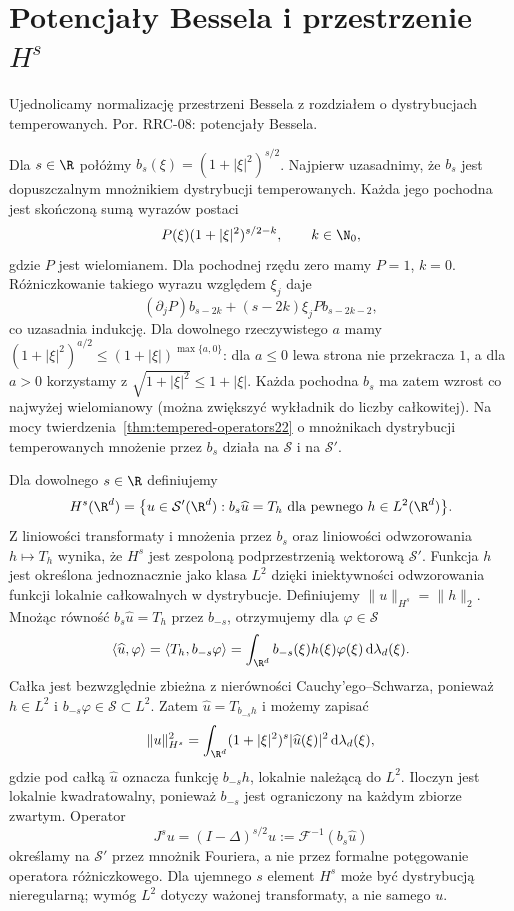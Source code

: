 \setcounter{section}{15}
\section{Potencjały Bessela i przestrzenie \texorpdfstring{$H^s$}{Hs}}
\label{sec:dt-bessel}
\providecommand{\atlasref}[2]{#2}

Ujednolicamy normalizację przestrzeni Bessela z rozdziałem
o dystrybucjach temperowanych. Por.
\atlasref{PDE-08::thm:pde8-Hs}{RRC-08: potencjały Bessela}.


Dla $s\in\R$ połóżmy $b_s(\xi)=(1+|\xi|^2)^{s/2}$.
Najpierw uzasadnimy, że $b_s$ jest dopuszczalnym
mnożnikiem dystrybucji temperowanych.
Każda jego pochodna jest skończoną sumą wyrazów
postaci
\[
 P(\xi)(1+|\xi|^2)^{s/2-k},
 \qquad k\in\N_0,
\]
gdzie $P$ jest wielomianem. Dla pochodnej rzędu
zero mamy $P=1$, $k=0$. Różniczkowanie takiego
wyrazu względem $\xi_j$ daje
\[
 (\partial_j P)b_{s-2k}
 +(s-2k)\xi_j P b_{s-2k-2},
\]
co uzasadnia indukcję.
Dla dowolnego rzeczywistego $a$ mamy
$(1+|\xi|^2)^{a/2}\le(1+|\xi|)^{\max\{a,0\}}$:
dla $a\le0$ lewa strona nie przekracza $1$,
a dla $a>0$ korzystamy z
$\sqrt{1+|\xi|^2}\le1+|\xi|$.
Każda pochodna $b_s$ ma zatem wzrost co najwyżej
wielomianowy (można zwiększyć wykładnik do
liczby całkowitej). Na mocy twierdzenia~\ref{thm:tempered-operators22}
o mnożnikach dystrybucji temperowanych
mnożenie przez $b_s$ działa na $\mathcal S$
i na $\mathcal S'$.

\begin{definicja}
\label{def:dt-Hs}
Dla dowolnego $s\in\R$ definiujemy
\[
 H^s(\R^d)=\bigl\{u\in\mathcal S'(\R^d):
 b_s\widehat u=T_h\text{ dla pewnego }
 h\in L^2(\R^d)\bigr\}.
\]
Z liniowości transformaty i mnożenia przez $b_s$
oraz liniowości odwzorowania $h\mapsto T_h$
wynika, że $H^s$ jest zespoloną podprzestrzenią
wektorową $\mathcal S'$.
Funkcja $h$ jest określona jednoznacznie jako
klasa $L^2$ dzięki iniektywności odwzorowania
funkcji lokalnie całkowalnych w dystrybucje.
Definiujemy
$\|u\|_{H^s}=\|h\|_2$.
Mnożąc równość $b_s\widehat u=T_h$ przez
$b_{-s}$, otrzymujemy dla $\varphi\in\mathcal S$
\[
 \langle\widehat u,\varphi\rangle
 =\langle T_h,b_{-s}\varphi\rangle
 =\int_{\R^d}b_{-s}(\xi)h(\xi)\varphi(\xi)
 \,\mathrm d\lambda_d(\xi).
\]
Całka jest bezwzględnie zbieżna z nierówności
Cauchy'ego--Schwarza, ponieważ $h\in L^2$
i $b_{-s}\varphi\in\mathcal S\subset L^2$.
Zatem $\widehat u=T_{b_{-s}h}$ i możemy zapisać
\[
 \|u\|_{H^s}^2=\int_{\R^d}
 (1+|\xi|^2)^s|\widehat u(\xi)|^2\,
 \mathrm d\lambda_d(\xi),
\]
gdzie pod całką $\widehat u$ oznacza funkcję
$b_{-s}h$, lokalnie należącą do $L^2$.
Iloczyn jest lokalnie kwadratowalny, ponieważ
$b_{-s}$ jest ograniczony na każdym zbiorze zwartym.
Operator
\[
 J^s u=(I-\Delta)^{s/2}u
 :=\mathcal F^{-1}(b_s\widehat u)
\]
określamy na $\mathcal S'$ przez mnożnik Fouriera,
a nie przez formalne potęgowanie operatora
różniczkowego.
Dla ujemnego $s$ element $H^s$ może być
dystrybucją nieregularną; wymóg $L^2$ dotyczy
ważonej transformaty, a nie samego $u$.
\end{definicja}

